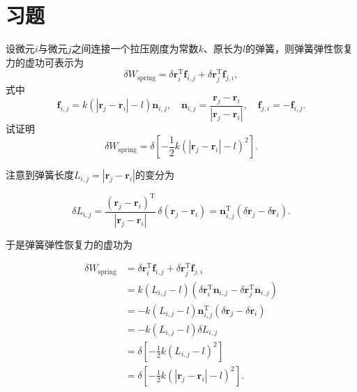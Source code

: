 \section*{习题}
设微元$i$与微元$j$之间连接一个拉压刚度为常数$k$、原长为$l$的弹簧，则弹簧弹性恢复力的虚功可表示为
\[
\delta W_{\text{spring}} = \delta\boldsymbol{r}_i^{\mathrm{T}}\boldsymbol{f}_{i,j} + \delta\boldsymbol{r}_j^{\mathrm{T}}\boldsymbol{f}_{j,i},
\]
式中
\[
\boldsymbol{f}_{i,j} = k\left(|\boldsymbol{r}_j - \boldsymbol{r}_i| - l\right)\boldsymbol{n}_{i,j},
    \quad
    \boldsymbol{n}_{i,j} = \frac{\boldsymbol{r}_j - \boldsymbol{r}_i}{|\boldsymbol{r}_j - \boldsymbol{r}_i|},
    \quad
    \boldsymbol{f}_{j,i} = -\boldsymbol{f}_{i,j}.
\]
试证明
\[
\delta W_{\text{spring}} = \delta\left[-\frac{1}{2}k\left(|\boldsymbol{r}_j - \boldsymbol{r}_i| - l\right)^2\right].
\]
\begin{solution}
注意到弹簧长度$L_{i,j} = |\boldsymbol{r}_j - \boldsymbol{r}_i|$的变分为

\[
\delta L_{i,j} = \frac{(\boldsymbol{r}_j - \boldsymbol{r}_i)^{\mathrm{T}}}{|\boldsymbol{r}_j - \boldsymbol{r}_i|}\,\delta(\boldsymbol{r}_j - \boldsymbol{r}_i) = \boldsymbol{n}_{i,j}^{\mathrm{T}}\left(\delta\boldsymbol{r}_j - \delta\boldsymbol{r}_i\right).
\]

于是弹簧弹性恢复力的虚功为

\[
\begin{aligned}
\delta W_{\text{spring}}
&= \delta\boldsymbol{r}_i^{\mathrm{T}}\boldsymbol{f}_{i,j} + \delta\boldsymbol{r}_j^{\mathrm{T}}\boldsymbol{f}_{j,i} \\
&= k\left(L_{i,j} - l\right)\left(\delta\boldsymbol{r}_i^{\mathrm{T}}\boldsymbol{n}_{i,j} - \delta\boldsymbol{r}_j^{\mathrm{T}}\boldsymbol{n}_{i,j}\right) \\
&= -k\left(L_{i,j} - l\right)\boldsymbol{n}_{i,j}^{\mathrm{T}}\left(\delta\boldsymbol{r}_j - \delta\boldsymbol{r}_i\right) \\
&= -k\left(L_{i,j} - l\right)\delta L_{i,j} \\
&= \delta\left[-\frac{1}{2}k\left(L_{i,j} - l\right)^2\right] \\
&= \delta\left[-\frac{1}{2}k\left(|\boldsymbol{r}_j - \boldsymbol{r}_i| - l\right)^2\right].
\end{aligned}
\]
\end{solution}
